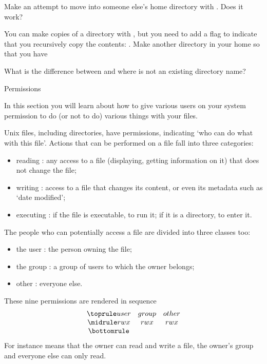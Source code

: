 Make an attempt to move into someone else's home directory with
. Does it work?

You can make copies of a directory with , but you need to add a
flag to indicate that you recursively copy the contents: . Make another directory  in your home so that you have


What is the difference between
and
where  is not an
existing directory name?

 {Permissions}
\label{sec:unix-permissions}

\begin{purpose}
  In this section you will learn about how to give various users on
  your system permission to do (or not to do) various things with your
  files.
\end{purpose}

Unix files, including directories,
have permissions, indicating `who can do what with this
file'. Actions that can be performed on a file fall into three
categories:
\begin{itemize}
\item reading : any access to a file (displaying, getting information
  on it) that does not change the file;
\item writing : access to a file that changes its content, or even its
  metadata such as `date modified';
\item executing : if the file is executable, to run it; if it is a
  directory, to enter it.
\end{itemize}
The people who can potentially access a file are divided into three
classes too:
\begin{itemize}
\item the user : the person owning the file;
\item the group : a group of users to which the owner belongs;
\item other : everyone else.
\end{itemize}
These nine permissions are rendered in sequence
\[ \begin{array}{ccc}
  \toprule user&group&other\\ \midrule rwx&rwx&rwx \\ \bottomrule
\end{array}
\]
For instance
 means that the owner can read and write a file, the owner's
group and everyone else can only read. 

